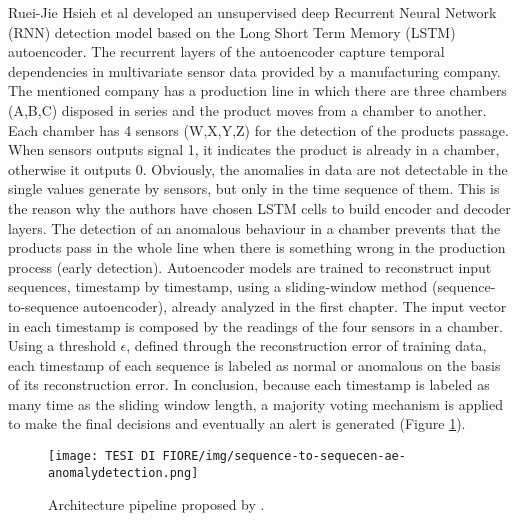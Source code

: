 Ruei-Jie Hsieh et al \cite{9UnsupervisedOnlineAnomalyDetectionMultivariate} developed an unsupervised deep Recurrent Neural Network (RNN) detection model based on the Long Short Term Memory (LSTM) autoencoder. The recurrent layers of the autoencoder capture temporal dependencies in multivariate sensor data provided by a manufacturing company. The mentioned company has a production line in which there are three chambers (A,B,C) disposed in series and the product moves from a chamber to another. Each chamber has 4 sensors (W,X,Y,Z) for the detection of the products passage. When sensors outputs signal 1, it indicates the product is already in a chamber, otherwise it outputs 0. Obviously, the anomalies in data are not detectable in the single values generate by sensors, but only in the time sequence of them. This is the reason why the authors have chosen LSTM cells to build encoder and decoder layers. The detection of an anomalous behaviour in a chamber prevents that the products pass in the whole line when there is something wrong in the production process (early detection). Autoencoder models are trained to reconstruct input sequences, timestamp by timestamp, using a sliding-window method (sequence-to-sequence autoencoder), already analyzed in the first chapter. The input vector in each timestamp is composed by the readings of the four sensors in a chamber. Using a threshold $\epsilon$, defined through the reconstruction error of training data, each timestamp of each sequence is labeled as normal or anomalous on the basis of its reconstruction error. In conclusion, because each timestamp is labeled as many time as the sliding window length, a majority voting mechanism is applied to make the final decisions and eventually an alert is generated (Figure \ref{seq2seq-architecture}).\\
\begin{figure}[ht]
\texttt{[image: TESI DI FIORE/img/sequence-to-sequecen-ae-anomalydetection.png]}
\centering
\caption{Architecture pipeline proposed by \cite{9UnsupervisedOnlineAnomalyDetectionMultivariate}.}
\label{seq2seq-architecture}
\end{figure}\\
